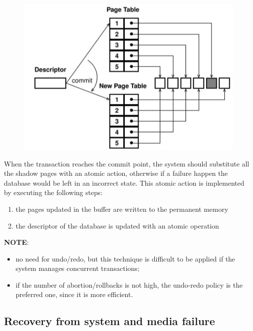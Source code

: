 \begin{figure}[h!]
		\centering
		\includegraphics[scale = 1.3]{img/tr7.jpg}
		\label{tr2}
\end{figure}


When the transaction reaches the commit point, the system should substitute all the shadow pages with an atomic action, otherwise if a failure happen the database would be left in an incorrect state. This atomic action is implemented by executing the following steps:

\begin{enumerate}
    \item the pages updated in the buffer are written to the permanent memory
    \item the descriptor of the database is updated with an atomic operation
\end{enumerate}

\textbf{NOTE}: 

\begin{itemize}

    \item no need for undo/redo, but this technique is difficult to be applied if the system manages concurrent transactions;
    
    \item if the number of abortion/rollbacks is not high, the undo-redo policy is the preferred one, since it is more efficient.
    
\end{itemize}

\subsection{Recovery from system and media failure}

